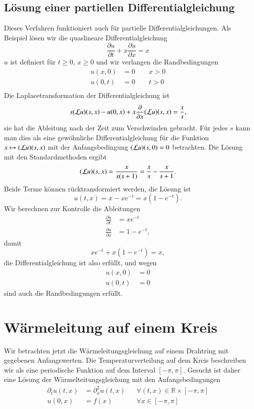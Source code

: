 \subsection{Lösung einer partiellen Differentialgleichung}
Dieses Verfahren funktioniert auch für partielle Differentialgleichungen.
Als Beispiel lösen wir die quaslineare Differentialgleichung
\[
\frac{\partial u}{\partial t}+x\frac{\partial u}{\partial x}=x
\]
$u$ ist definiert für $t\ge0$, $x\ge 0$ und wir verlangen die Randbedingungen
\begin{align*}
u(x,0)&=0\qquad x>0\\
u(0,t)&=0\qquad t>0\\
\end{align*}
Die Laplacetransformation der Differentialgleichung ist
\[
s({\cal L}u)(s,x)-u(0,x)+x\frac{\partial}{\partial x}({\cal L}u)(s,x)=\frac{x}{s},
\]
sie hat die Ableitung nach der Zeit zum Verschwinden gebracht. Für jedes
$s$ kann man dies als eine gewöhnliche Differentialgleichung für die
Funktion $x\mapsto ({\cal L}u)(s,x)$ mit der Anfangsbedingung
$({\cal L}u)(s,0)=0$ betrachten.
Die Lösung mit den Standardmethoden 
ergibt
\[
({\cal L}u)(s,x)=\frac{x}{s(s+1)}=\frac{x}{s}-\frac{x}{s+1}.
\]
Beide Terme können rücktransformiert werden, die Lösung ist
\[
u(t,x)=x-xe^{-t}=x(1-e^{-t}).
\]
Wir berechnen zur Kontrolle die Ableitungen
\begin{align*}
\frac{\partial u}{\partial t}
&=
xe^{-t}
\\
\frac{\partial u}{\partial x}
&=
1-e^{-t},
\end{align*}
damit 
\[
xe^{-t}+x(1-e^{-t})=x,
\]
die Differentialgleichung ist also erfüllt, und wegen
\begin{align*}
u(x,0)
&=
0
\\
u(0,t)
&=
0
\end{align*}
sind auch die Randbedingungen erfüllt.

\section{Wärmeleitung auf einem Kreis}
Wir betrachten jetzt die Wärmeleitungsgleichung auf einem Drahtring
mit gegebenen Anfangswerten. Die Temperaturverteilung auf dem
Kreis beschreiben wir als eine periodische Funktion auf dem Interval
$[-\pi,\pi]$. Gesucht ist daher eine Lösung der Wärmelteitungsgleichung
mit den Anfangsbedingungen
\begin{align*}
\partial_t u(t,x)&=\partial_x^2 u(t,x) &&\forall(t,x)\in\mathbb R\times[-\pi,\pi]\\
u(0,x)&=f(x)&& \forall x\in[-\pi,\pi]\\
\end{align*}

